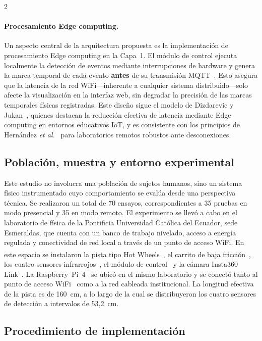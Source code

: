 \documentclass[12pt,twoside,titlepage]{ingenius}
\begin{document}
\begin{multicols}{2}
\paragraph{Procesamiento Edge computing.}
Un aspecto central de la arquitectura propuesta es la implementaci\'on de procesamiento Edge computing en la Capa~1. El m\'odulo de control ejecuta localmente la detecci\'on de eventos mediante interrupciones de hardware y genera la marca temporal de cada evento \textbf{antes} de su transmisi\'on MQTT~\cite{r12}. Esto asegura que la latencia de la red WiFi---inherente a cualquier sistema distribuido---solo afecte la visualizaci\'on en la interfaz web, sin degradar la precisi\'on de las marcas temporales f\'isicas registradas. Este dise\~no sigue el modelo de Dizdarevic y Jukan~\cite{r7}, quienes destacan la reducci\'on efectiva de latencia mediante Edge computing en entornos educativos IoT, y es consistente con los principios de Hern\'andez \textit{et al.}~\cite{r51} para laboratorios remotos robustos ante desconexiones.

\subsection{Poblaci\'on, muestra y entorno experimental}

Este estudio no involucra una poblaci\'on de sujetos humanos, sino un sistema f\'isico instrumentado cuyo comportamiento se eval\'ua desde una perspectiva t\'ecnica. Se realizaron un total de 70 ensayos, correspondientes a 35 pruebas en modo presencial y 35 en modo remoto. El experimento se llev\'o a cabo en el laboratorio de f\'isica de la Pontificia Universidad Cat\'olica del Ecuador, sede Esmeraldas, que cuenta con un banco de trabajo nivelado, acceso a energ\'ia regulada y conectividad de red local a trav\'es de un punto de acceso WiFi. En este espacio se instalaron la pista tipo Hot Wheels\textsuperscript{\textregistered}~\cite{r18}, el carrito de baja fricci\'on~\cite{r19}, los cuatro sensores infrarrojos~\cite{r20}, el m\'odulo de control~\cite{r21,r53} y la c\'amara Insta360 Link~\cite{r36}. La Raspberry~Pi~4~\cite{r37} se ubic\'o en el mismo laboratorio y se conect\'o tanto al punto de acceso WiFi~\cite{r32} como a la red cableada institucional. La longitud efectiva de la pista es de 160~cm, a lo largo de la cual se distribuyeron los cuatro sensores de detecci\'on a intervalos de 53,2~cm.

\subsection{Procedimiento de implementaci\'on}


\end{multicols}
\end{document}
